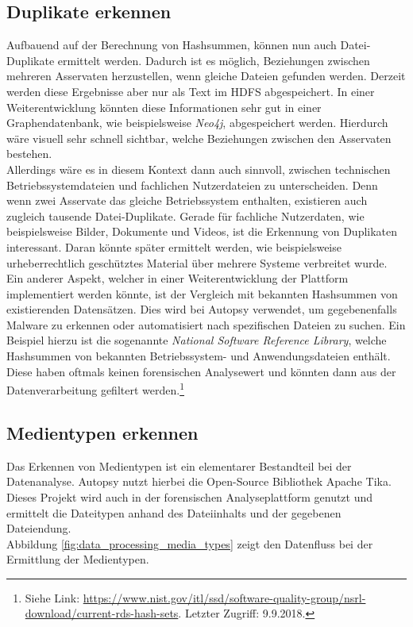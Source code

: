 \subsection{Duplikate erkennen}
\label{subsec:duplicate_files}
Aufbauend auf der Berechnung von Hashsummen, können nun auch Datei-Duplikate ermittelt werden. Dadurch ist es möglich, Beziehungen zwischen mehreren Asservaten herzustellen, wenn gleiche Dateien gefunden werden.
Derzeit werden diese Ergebnisse aber nur als Text im HDFS abgespeichert. In einer Weiterentwicklung könnten diese Informationen sehr gut in einer Graphendatenbank, wie beispielsweise \textit{Neo4j}, abgespeichert werden. Hierdurch wäre visuell sehr schnell sichtbar, welche Beziehungen zwischen den Asservaten bestehen.\\ 
Allerdings wäre es in diesem Kontext dann auch sinnvoll, zwischen technischen Betriebssystemdateien und fachlichen Nutzerdateien zu unterscheiden. Denn wenn zwei Asservate das gleiche Betriebssystem enthalten, existieren auch zugleich tausende Datei-Duplikate. Gerade für fachliche Nutzerdaten, wie beispielsweise Bilder, Dokumente und Videos, ist die Erkennung von Duplikaten interessant. Daran könnte später ermittelt werden, wie beispielsweise urheberrechtlich geschütztes Material über mehrere Systeme verbreitet wurde.\\

\noindent
Ein anderer Aspekt, welcher in einer Weiterentwicklung der Plattform implementiert werden könnte, ist der Vergleich mit bekannten Hashsummen von existierenden Datensätzen. Dies wird bei Autopsy verwendet, um gegebenenfalls Malware zu erkennen oder automatisiert nach spezifischen Dateien zu suchen. Ein Beispiel hierzu ist die sogenannte \textit{National Software Reference Library}, welche Hashsummen von bekannten Betriebssystem- und Anwendungsdateien enthält. Diese haben oftmals keinen forensischen Analysewert und könnten dann aus der Datenverarbeitung gefiltert werden.\footnote{Siehe Link: \url{https://www.nist.gov/itl/ssd/software-quality-group/nsrl-download/current-rds-hash-sets}. Letzter Zugriff: 9.9.2018.} \cite[S. 36]{digital_forensics}

\subsection{Medientypen erkennen}
\label{subsec:media_types}

Das Erkennen von Medientypen ist ein elementarer Bestandteil bei der Datenanalyse. Autopsy nutzt hierbei die Open-Source Bibliothek Apache Tika\texttrademark. Dieses Projekt wird auch in der forensischen Analyseplattform genutzt und ermittelt die Dateitypen anhand des Dateiinhalts und der gegebenen Dateiendung.\\
Abbildung \ref{fig:data_processing_media_types} zeigt den Datenfluss bei der Ermittlung der Medientypen.\\

